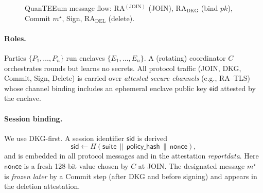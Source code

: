 \documentclass[runningheads,orivec]{llncs}
\newcommand{\RA}{\mathsf{RA}}
\begin{document}
\begin{figure}[!htbp]
\caption{QuanTEEum message flow: RA$^{(\mathrm{JOIN})}$ (JOIN), RA$_\mathrm{DKG}$ (bind $pk$), Commit $m^{\star}$, Sign, RA$_\mathrm{DEL}$ (delete).}
\label{fig:flow}
\end{figure}

\paragraph{Roles.}
Parties $\{P_1,\dots,P_n\}$ run enclaves $\{E_1,\dots,E_n\}$.
A (rotating) coordinator $C$ orchestrates rounds but learns no secrets.
All protocol traffic (JOIN, DKG, Commit, Sign, Delete) is carried over
\emph{attested secure channels} (e.g., RA–TLS) whose channel binding includes an
ephemeral enclave public key $\mathsf{eid}$ attested by the enclave.

\paragraph{Session binding.}
We use DKG-first. A session identifier $\mathsf{sid}$ is derived
\[
  \mathsf{sid} \gets H(\mathsf{suite}\,\|\,\mathsf{policy\_hash}\,\|\,\mathsf{nonce}),
\]
and is embedded in all protocol messages and in the attestation \emph{reportdata}.
Here $\mathsf{nonce}$ is a fresh 128-bit value chosen by $C$ at JOIN.
The designated message $m^{\star}$ is \emph{frozen later} by a Commit step
(after DKG and before signing) and appears in the deletion attestation.
\end{document}
